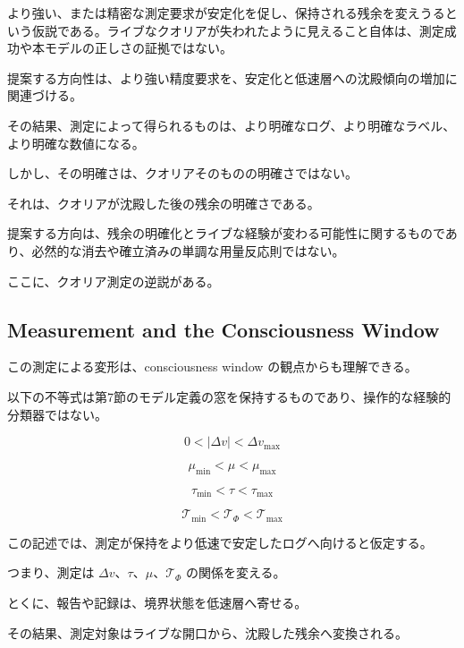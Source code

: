 より強い、または精密な測定要求が安定化を促し、保持される残余を変えうるという仮説である。ライブなクオリアが失われたように見えること自体は、測定成功や本モデルの正しさの証拠ではない。

提案する方向性は、より強い精度要求を、安定化と低速層への沈殿傾向の増加に関連づける。

その結果、測定によって得られるものは、より明確なログ、より明確なラベル、より明確な数値になる。

しかし、その明確さは、クオリアそのものの明確さではない。

それは、クオリアが沈殿した後の残余の明確さである。

提案する方向は、残余の明確化とライブな経験が変わる可能性に関するものであり、必然的な消去や確立済みの単調な用量反応則ではない。

ここに、クオリア測定の逆説がある。

\subsection{Measurement and the Consciousness Window}

この測定による変形は、consciousness window の観点からも理解できる。

以下の不等式は第7節のモデル定義の窓を保持するものであり、操作的な経験的分類器ではない。

\begin{equation}
0 < |\Delta v| < \Delta v_{\max}
\end{equation}

\begin{equation}
\mu_{\min} < \mu < \mu_{\max}
\end{equation}

\begin{equation}
\tau_{\min} < \tau < \tau_{\max}
\end{equation}

\begin{equation}
\mathcal{T}_{\min}
<
\mathcal{T}_{\Phi}
<
\mathcal{T}_{\max}
\end{equation}

この記述では、測定が保持をより低速で安定したログへ向けると仮定する。

つまり、測定は $\Delta v$、$\tau$、$\mu$、$\mathcal{T}_{\Phi}$ の関係を変える。

とくに、報告や記録は、境界状態を低速層へ寄せる。

その結果、測定対象はライブな開口から、沈殿した残余へ変換される。

